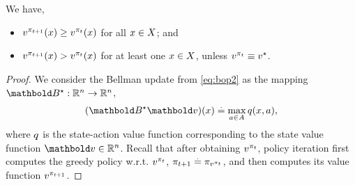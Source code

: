 \begin{lem}\label{lem:policy_iteration_mon_impr}
  We have, \begin{itemize}
    \item $\v[\pi_{t+1}]{x} \geq \v[\pi_t]{x}$ for all $x \in X$; and
    \item $\v[\pi_{t+1}]{x} > \v[\pi_t]{x}$ for at least one $x \in X$, unless $\fnv[\pi_t] \equiv \fnv[\star]$.
  \end{itemize}
\end{lem}
\begin{proof}
  We consider the Bellman update from \eqref{eq:bop2} as the mapping $\mBs : \R^n \to \R^n$, \begin{align}
    (\mBs \vv)(x) \defeq \max_{a \in \sA} \q{x}{a}, \label{eq:bellman_update_operator}
  \end{align} where $\fnq$ is the state-action value function corresponding to the state value function $\vv \in \R^n$.
  Recall that after obtaining $\fnv[\pi_t]$, policy iteration first computes the greedy policy w.r.t. $\fnv[\pi_t]$, $\pi_{t+1} \defeq \pi_{\fnv[\pi_t]}$, and then computes its value function $\fnv[\pi_{t+1}]$.


\end{proof}
